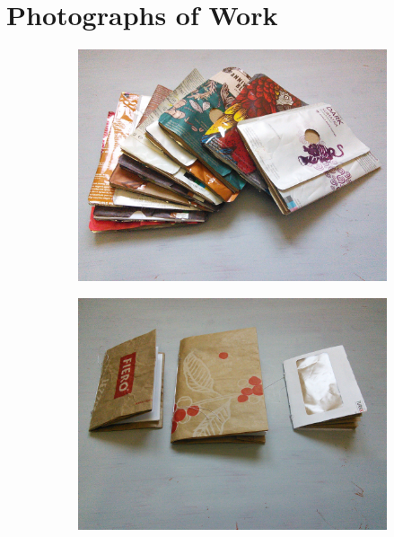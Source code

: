 \appendix
\chapter{Photographs of Work}


\begin{figure}
    \centering
    \begin{subfigure}[t]{0.47\textwidth}
        \includegraphics[width=\textwidth]{project_graphics/notebooks1.jpg}
    \end{subfigure}
    \begin{subfigure}[t]{0.47\textwidth}
        \includegraphics[width=\textwidth]{project_graphics/notebooks2.jpg}
    \end{subfigure}
    \label{fig:CollectedMaterials1}
\end{figure}